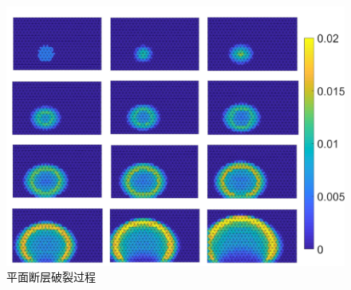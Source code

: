 \begin{figure}[!h]
  \centerin
  \includegraphics[width=0.99\linewidth]{img/rupture1.png}
    \caption{ 平面断层破裂过程} \label{fig:rupture-process}
 \end{figure}
  
